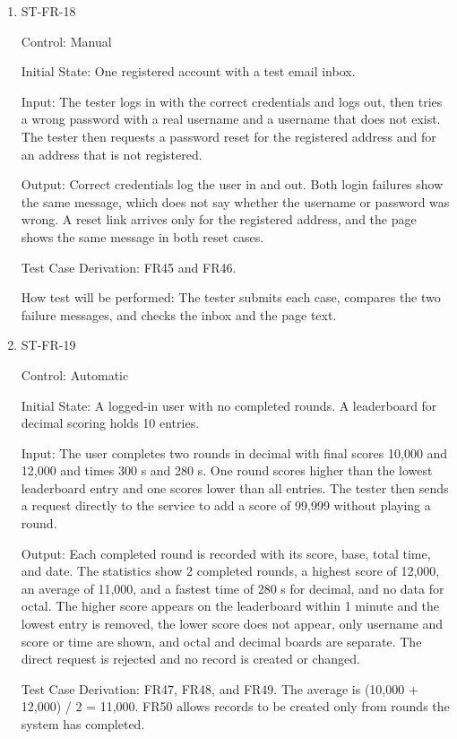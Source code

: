 \documentclass[12pt, titlepage]{article}
\begin{document}
\begin{enumerate}
\item{ST-FR-18\\}

Control: Manual

Initial State: One registered account with a test email inbox.

Input: The tester logs in with the correct credentials and logs out, then tries a wrong password with a real username and a username that does not exist. The tester then requests a password reset for the registered address and for an address that is not registered.

Output: Correct credentials log the user in and out. Both login failures show the same message, which does not say whether the username or password was wrong. A reset link arrives only for the registered address, and the page shows the same message in both reset cases.

Test Case Derivation: FR45 and FR46.

How test will be performed: The tester submits each case, compares the two failure messages, and checks the inbox and the page text.

\item{ST-FR-19\\}

Control: Automatic

Initial State: A logged-in user with no completed rounds. A leaderboard for decimal scoring holds 10 entries.

Input: The user completes two rounds in decimal with final scores 10,000 and 12,000 and times 300 s and 280 s. One round scores higher than the lowest leaderboard entry and one scores lower than all entries. The tester then sends a request directly to the service to add a score of 99,999 without playing a round.

Output: Each completed round is recorded with its score, base, total time, and date. The statistics show 2 completed rounds, a highest score of 12,000, an average of 11,000, and a fastest time of 280 s for decimal, and no data for octal. The higher score appears on the leaderboard within 1 minute and the lowest entry is removed, the lower score does not appear, only username and score or time are shown, and octal and decimal boards are separate. The direct request is rejected and no record is created or changed.

Test Case Derivation: FR47, FR48, and FR49. The average is (10,000 + 12,000) / 2 = 11,000. FR50 allows records to be created only from rounds the system has completed.


\end{enumerate}
\end{document}
